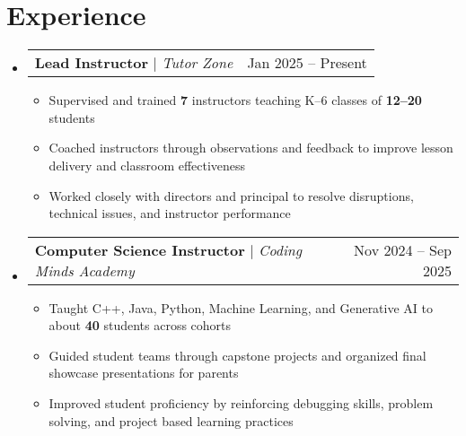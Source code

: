 \documentclass[letterpaper,11pt]{article}
\makeatletter
\newcommand{\resumeItem}[1]{
  \item\small{
    {#1 \vspace{-2pt}}
  }
}
\newcommand{\resumeSubSubheading}[2]{
    \item
    \begin{tabular*}{0.97\textwidth}{l@{\extracolsep{\fill}}r}
      \textit{\small#1} & \textit{\small #2} \\
    \end{tabular*}\vspace{-7pt}
}
\newcommand{\resumeProjectHeading}[2]{
    \item
    \begin{tabular*}{0.97\textwidth}{l@{\extracolsep{\fill}}r}
      \small#1 & #2 \\
    \end{tabular*}\vspace{-7pt}
}
\newcommand{\resumeSubHeadingListStart}{\begin{itemize}[leftmargin=0.15in, label={}]}
\newcommand{\resumeSubHeadingListEnd}{\end{itemize}}
\newcommand{\resumeItemListStart}{\begin{itemize}}
\newcommand{\resumeItemListEnd}{\end{itemize}\vspace{-5pt}}
\makeatother
\begin{document}
\section{Experience}
    \resumeSubHeadingListStart
    \resumeProjectHeading
          {\textbf{Lead Instructor} $|$ \emph{Tutor Zone}}{Jan 2025 -- Present}
          \resumeItemListStart
            \resumeItem{Supervised and trained \textbf{7} instructors teaching K–6 classes of \textbf{12–20} students}
            \resumeItem{Coached instructors through observations and feedback to improve lesson delivery and classroom effectiveness}
            \resumeItem{Worked closely with directors and principal to resolve disruptions, technical issues, and instructor performance}
          \resumeItemListEnd
          \resumeProjectHeading
          {\textbf{Computer Science Instructor} $|$ \emph{Coding Minds Academy}}{Nov 2024 -- Sep 2025}
          \resumeItemListStart
            \resumeItem{Taught C++, Java, Python, Machine Learning, and Generative AI to about \textbf{40} students across cohorts}
            \resumeItem{Guided student teams through capstone projects and organized final showcase presentations for parents}
            \resumeItem{Improved student proficiency by reinforcing debugging skills, problem solving, and project based learning practices}
          \resumeItemListEnd
    \resumeSubHeadingListEnd
      


\end{document}
